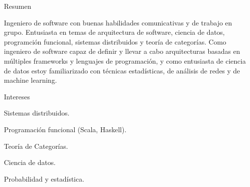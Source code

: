 \documentclass[spanish]{resume} %
\begin{document}

\begin{rSection}{Resumen}

Ingeniero de software con buenas habilidades comunicativas y de trabajo en grupo. Entusiasta en temas de arquitectura de software, ciencia de datos, programci\'on funcional, sistemas distribuidos y teor\'ia de categor\'ias. Como ingeniero de software capaz de definir y llevar a cabo arquitecturas basadas en m\'ultiples frameworks y lenguajes de programaci\'on, y como entusiasta de ciencia de datos estoy familiarizado con t\'ecnicas estad\'isticas, de an\'alisis de redes y de machine learning.

\end{rSection}

\begin{rSection}{Intereses}

\item Sistemas distribuidos.
\item Programaci\'on funcional (Scala, Haskell).
\item Teor\'ia de Categor\'ias.
\item Ciencia de datos.
\item Probabilidad y estad\'istica.

\end{rSection}
\end{document}
